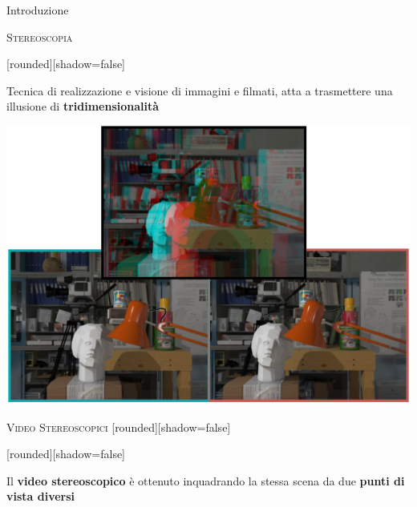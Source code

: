 \documentclass{beamer}
\begin{document}
\begin{section}{Introduzione}

\begin{frame}[t]{\textsc{Stereoscopia}}
\vspace{-1em}
\begin{center}
	[rounded][shadow=false]
\begin{block}{}
	\center Tecnica di realizzazione e visione di immagini e filmati, atta a trasmettere una illusione di \textbf{tridimensionalit\`{a}}
	\end{block}
\end{center}
\begin{center}
\vspace{-0.3em}
\includegraphics[width=0.7\linewidth]{./img/stereo.png}
\end{center}
\end{frame}




\begin{frame}[t]{\textsc{Video Stereoscopici}}
[rounded][shadow=false]
	\vspace{-0.5em}
	\begin{center}
		[rounded][shadow=false]
	\begin{block}{}
		\center Il \textbf{video stereoscopico} \`{e} ottenuto inquadrando la stessa scena da due \textbf{punti di vista diversi}
		\end{block}
	\end{center}
\begin{center}
\end{center}
\end{frame}


\end{section}
\end{document}
